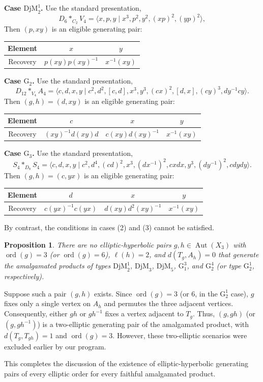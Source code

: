 \documentclass[12pt,leqno]{amsart}
\makeatletter
\renewenvironment{proof}[1][\proofname]{%
	\par
	\pushQED{\qed}%
	\normalfont
	\topsep6\p@\@plus6\p@\relax
	\trivlist
	\item[\hskip\labelsep\itshape #1\@addpunct{.}]%
	\ignorespaces
}{%
	\par\nobreak\vspace{2pt}%
	\popQED%
	\medskip%
	\endtrivlist
	\@endpefalse
}
\newcommand{\2}{L^2_{\rm per}(0, T)}
\newtheorem{prop}{Proposition}[section]
\newcommand{\aut}{{\operatorname{Aut}}}
\newcommand{\ord}{{\operatorname{ord}}}
\numberwithin{equation}{section}
\numberwithin{figure}{section}
\makeatother
\begin{document}
\begin{proof}
    \textbf{Case $\mathrm{DjM}_2^1$.} Use the standard presentation,
    \[
    D_6*_{C_2}V_4 = \langle x,p,y\mid x^3,p^2,y^2,(xp)^2,(yp)^2\rangle,
    \]
    Then $(p,xy)$ is an eligible generating pair:
    \begin{center}
        \begin{tabular}{c||c|c}
            Element & $x$ & $y$ \\
             \hline
            Recovery & $p(xy)p(xy)^{-1}$ & $x^{-1}(xy)$
        \end{tabular}
    \end{center}
    
    \textbf{Case $\mathrm{G}_2$.} Use the standard presentation,
    \[
    D_{12}*_{V_4}A_4 = \langle c, d, x, y \mid c^2, d^2, [c, d], x^3, y^3,(cx)^2, [d, x],(cy)^3, dy^{-1}cy \rangle.
    \]
    Then $(g,h) = (d,xy)$ is an eligible generating pair:
    \begin{center}
        \begin{tabular}{c||c|c|c}
            Element & $c$ & $x$ & $y$ \\
             \hline
            Recovery & $(xy)^{-1}d(xy)d$ & $c(xy)d(xy)^{-1}$ & $x^{-1}(xy)$
        \end{tabular}
    \end{center}
    \textbf{Case $\mathrm{G}_3$.} Use the standard presentation,
    \[
    S_4*_{D_8}S_4 = \langle c, d, x, y \mid c^2, d^4, (cd)^2, x^3,(dx^{-1})^2, cxdx, y^3,(dy^{-1})^2, cdydy \rangle.
    \]
    Then $(g,h) = (c,yx)$ is an eligible generating pair:
    \begin{center}
        \begin{tabular}{c||c|c|c}
            Element & $d$ & $x$ & $y$ \\
             \hline
            Recovery & $c(yx)^{-1}c(yx)$ & $d(xy)d^2(xy)^{-1}$ & $x^{-1}(xy)$
        \end{tabular}
    \end{center}
\end{proof}
By contrast, the conditions in cases (2) and (3) cannot be satisfied.
\begin{prop}\label{prop:ell_hyp_3}
    There are no elliptic-hyperbolic pairs $g,h\in\aut(X_3)$ with $\ord(g) = 3$ (or $\ord(g) = 6$), $\ell(h) = 2$, and $d(T_g, A_h)=0$ that generate the amalgamated products of types $\mathrm{DjM}_2^1$, $\mathrm{DjM}_3$, $\mathrm{DjM}_5$, $\mathrm{G}_1^3$, and $\mathrm{G}_2^4$ (or type $\mathrm{G}_2^1$, respectively).
\end{prop}
\begin{proof}
    Suppose such a pair $(g,h)$ exists. Since $\ord(g) = 3$ (or $6$, in the $\mathrm{G}_2^1$ case), $g$ fixes only a single vertex on $A_h$ and permutes the three adjacent vertices. Consequently, either $gh$ or $gh^{-1}$ fixes a vertex adjacent to $T_g$. Thus, $(g,gh)$ (or $(g,gh^{-1})$) is a two-elliptic generating pair of the amalgamated product, with $d(T_g,T_{gh}) = 1$ and $\ord(g) = 3$. However, these two-elliptic scenarios were excluded earlier by our program.
\end{proof}
This completes the discussion of the existence of elliptic-hyperbolic generating pairs of every elliptic order for every faithful amalgamated product.
\end{document}
